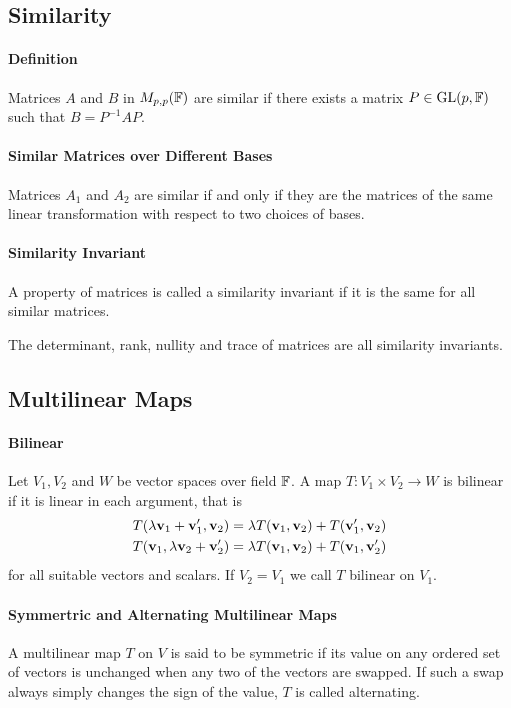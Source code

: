 \subsection{Similarity}
\paragraph{Definition}
Matrices \(A\) and \(B\) in \(M_{p,p}(\mathbb{F})\) are similar if there exists a matrix \(P \in \operatorname{GL}(p,\mathbb{F})\) such that \(B = P^{-1}AP\).

\paragraph{Similar Matrices over Different Bases}
Matrices \(A_1\) and \(A_2\) are similar if and only if they are the matrices of the same linear transformation with respect to two choices of bases.

\paragraph{Similarity Invariant}
A property of matrices is called a similarity invariant if it is the same for all similar matrices. 

The determinant, rank, nullity and trace of matrices are all similarity invariants.

\subsection{Multilinear Maps}
\paragraph{Bilinear}
Let \(V_1, V_2\) and \(W\) be vector spaces over field \(\mathbb{F}\). A map \(T: V_1 \times V_2 \to W\) is bilinear if it is linear in each argument, that is 
\begin{align*}
  T(\lambda\mathbf{v}_1 + \mathbf{v}_1', \mathbf{v}_2) & = \lambda T(\mathbf{v}_1, \mathbf{v}_2) + T(\mathbf{v}_1', \mathbf{v}_2) \\  
  T(\mathbf{v}_1, \lambda\mathbf{v}_2 + \mathbf{v}_2') & = \lambda T(\mathbf{v}_1, \mathbf{v}_2) + T(\mathbf{v}_1, \mathbf{v}'_2)
\end{align*}
for all suitable vectors and scalars. If \(V_2 = V_1\) we call \(T\) bilinear on \(V_1\).

\paragraph{Symmertric and Alternating Multilinear Maps}
A multilinear map \(T\) on \(V\) is said to be symmetric if its value on any ordered set of vectors is unchanged when any two of the vectors are swapped. If such a swap always simply changes the sign of the value, \(T\) is called alternating.